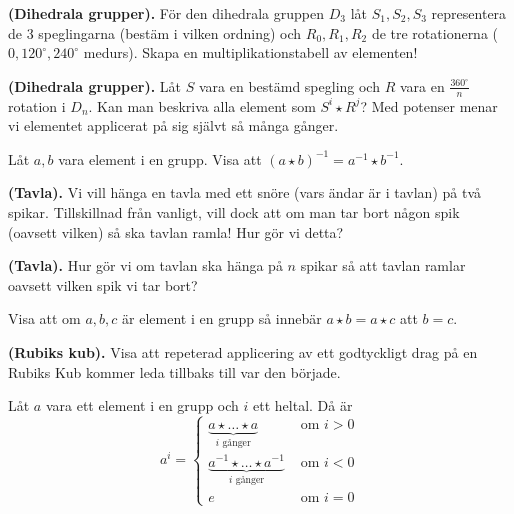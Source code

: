 \documentclass[11pt,fleqn]{book} %
\begin{document}
\begin{problem} \textbf{(Dihedrala grupper).} För den dihedrala gruppen \(D_3\) låt \(S_1, S_2, S_3\) representera de 3 speglingarna (bestäm i vilken ordning) och \(R_0, R_1, R_2\) de tre rotationerna (\(0, 120^\circ, 240 ^\circ \) medurs). Skapa en multiplikationstabell av elementen!
\end{problem}

\begin{problem} \textbf{(Dihedrala grupper).}
  Låt \(S\) vara en bestämd spegling och \(R\) vara en \(\frac{360^\circ}{n}\) rotation i \(D_n\). Kan man beskriva alla element som \(S ^i \star R^j\)? Med potenser menar vi elementet applicerat på sig självt så många gånger. %
\end{problem}

\begin{problem} Låt \(a, b\) vara element i en grupp. Visa att \((a  \star b) ^{-1} = a ^{-1} \star b ^{-1}\).
\end{problem}

\begin{problem} \textbf{(Tavla).}
 Vi vill hänga en tavla med ett snöre (vars ändar är i tavlan) på två spikar. Tillskillnad från vanligt, vill dock att om man tar bort någon spik (oavsett vilken) så ska tavlan ramla! Hur gör vi detta? %
\end{problem}

\begin{problem} \textbf{(Tavla).}
  Hur gör vi om tavlan ska hänga på \(n\) spikar så att tavlan ramlar oavsett vilken spik vi tar bort?
\end{problem}

\begin{problem}
  Visa att om \(a, b, c\) är element i en grupp så innebär \(a  \star b = a  \star c\) att \(b = c\).
\end{problem}

\begin{problem} \textbf{(Rubiks kub).}
  Visa att repeterad applicering av ett godtyckligt drag på en Rubiks Kub kommer leda tillbaks till var den började.
\end{problem}

\begin{definition}
  Låt \(a\) vara ett element i en grupp och \(i\) ett heltal. Då är
  \[
    a ^ i =
    \begin{cases}
      \underbrace{a  \star \dots  \star a}_{i \text{ gånger} } &\text{ om } i > 0 \\
      \underbrace{a ^{-1}  \star \dots  \star a ^{-1}}_{i \text{ gånger} } &\text{ om } i < 0 \\
      e &\text{ om } i = 0
    \end{cases} 
  \]
\end{definition}
\end{document}
